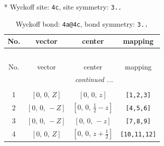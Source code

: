 \documentclass[fleqn,8pt]{jsarticle}
\begin{document}
* Wyckoff site: {\tt 4c}, site symmetry: {\tt 3..}
\renewcommand{\arraystretch}{1.2}
\begin{longtable}{cccc}
\caption{Wyckoff bond: {\tt 4a@4c}, bond symmetry: {\tt 3..}}
 \\
 \hline \hline
No. & vector & center & mapping \\ \hline \endfirsthead

\multicolumn{3}{l}{\tablename\ \thetable{}} \\
 \hline \hline
No. & vector & center & mapping \\ \hline \endhead

 \hline \hline
\multicolumn{3}{r}{\footnotesize\it continued ...} \\ \endfoot

 \hline \hline
\multicolumn{3}{r}{} \\ \endlastfoot

1 & $\left[ 0,\, 0,\, Z \right]$ & $\left[ 0,\, 0,\, z \right]$ & {\tt [1,2,3]} \\ \hline
2 & $\left[ 0,\, 0,\, - Z \right]$ & $\left[ 0,\, 0,\, \frac{1}{2} - z \right]$ & {\tt [4,5,6]} \\ \hline
3 & $\left[ 0,\, 0,\, - Z \right]$ & $\left[ 0,\, 0,\, - z \right]$ & {\tt [7,8,9]} \\ \hline
4 & $\left[ 0,\, 0,\, Z \right]$ & $\left[ 0,\, 0,\, z + \frac{1}{2} \right]$ & {\tt [10,11,12]} \\
\end{longtable}
\renewcommand{\arraystretch}{1.2}
\end{document}
